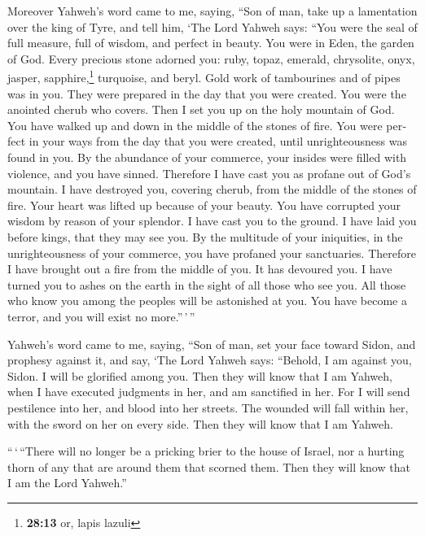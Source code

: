 \begin{paracol}{2}
\begin{otherlanguage}{english}
 Moreover Yahweh's word came to me, saying,
 ``Son of man, take up a lamentation over the king of
Tyre, and tell him, `The Lord Yahweh says: ``You were the seal of full
measure, full of wisdom, and perfect in beauty.  You were
in Eden, the garden of God. Every precious stone adorned you: ruby,
topaz, emerald, chrysolite, onyx, jasper, sapphire,\footnote{\textbf{28:13}
  or, lapis lazuli} turquoise, and beryl. Gold work of tambourines and
of pipes was in you. They were prepared in the day that you were
created.  You were the anointed cherub who covers. Then I
set you up on the holy mountain of God. You have walked up and down in
the middle of the stones of fire.  You were perfect in
your ways from the day that you were created, until unrighteousness was
found in you.  By the abundance of your commerce, your
insides were filled with violence, and you have sinned. Therefore I have
cast you as profane out of God's mountain. I have destroyed you,
covering cherub, from the middle of the stones of fire. 
Your heart was lifted up because of your beauty. You have corrupted your
wisdom by reason of your splendor. I have cast you to the ground. I have
laid you before kings, that they may see you.  By the
multitude of your iniquities, in the unrighteousness of your commerce,
you have profaned your sanctuaries. Therefore I have brought out a fire
from the middle of you. It has devoured you. I have turned you to ashes
on the earth in the sight of all those who see you.  All
those who know you among the peoples will be astonished at you. You have
become a terror, and you will exist no more.''\,'\,''

 Yahweh's word came to me, saying,  ``Son
of man, set your face toward Sidon, and prophesy against it,
 and say, `The Lord Yahweh says: ``Behold, I am against
you, Sidon. I will be glorified among you. Then they will know that I am
Yahweh, when I have executed judgments in her, and am sanctified in her.
 For I will send pestilence into her, and blood into her
streets. The wounded will fall within her, with the sword on her on
every side. Then they will know that I am Yahweh.

 ``\,`\,``There will no longer be a pricking brier to the
house of Israel, nor a hurting thorn of any that are around them that
scorned them. Then they will know that I am the Lord Yahweh.''


\end{otherlanguage}
\end{paracol}
